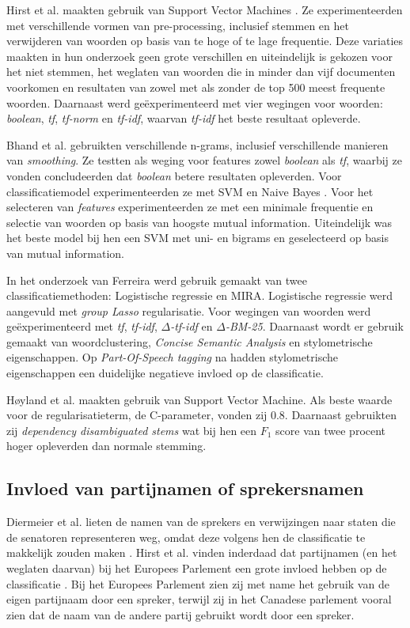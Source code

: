 Hirst et al. maakten  gebruik van Support Vector Machines \cite{Hirst_textto}. Ze experimenteerden met verschillende vormen van pre-processing, inclusief stemmen en het verwijderen van woorden op basis van te hoge of te lage frequentie. Deze variaties maakten in hun onderzoek geen grote verschillen en uiteindelijk is gekozen voor het niet stemmen, het weglaten van woorden die in minder dan vijf documenten voorkomen en resultaten van zowel met als zonder de top 500 meest frequente woorden. Daarnaast werd geëxperimenteerd met vier wegingen voor woorden: \textit{boolean}, \textit{tf}, \textit{tf-norm} en \textit{tf-idf}, waarvan \textit{tf-idf} het beste resultaat opleverde. \par
Bhand et al. gebruikten verschillende n-grams, inclusief verschillende manieren van \textit{smoothing}\cite{bhand}. Ze testten als weging voor features zowel \textit{boolean} als \textit{tf}, waarbij ze vonden concludeerden dat \textit{boolean} betere resultaten opleverden. Voor classificatiemodel experimenteerden ze met SVM en Naive Bayes . Voor het selecteren van \textit{features} experimenteerden ze met een minimale frequentie en selectie van woorden op basis van hoogste mutual information. Uiteindelijk was het beste model bij hen een SVM met uni- en bigrams en geselecteerd op basis van mutual information.\par
In het onderzoek van Ferreira werd gebruik gemaakt van twee classificatiemethoden: Logistische regressie en MIRA\cite{Ferreira2016UsingTT}. Logistische regressie werd aangevuld met \textit{group Lasso} regularisatie. Voor wegingen van woorden werd geëxperimenteerd met \textit{tf}, \textit{tf-idf}, \textit{$\Delta$-tf-idf} en \textit{$\Delta$-BM-25}. Daarnaast wordt er gebruik gemaakt van woordclustering, \textit{Concise Semantic Analysis} en stylometrische eigenschappen. Op \textit{Part-Of-Speech tagging} na hadden stylometrische eigenschappen een duidelijke negatieve invloed op de classificatie.\par
Høyland et al. maakten gebruik van Support Vector Machine\cite{W14-2516}. Als beste waarde voor de regularisatieterm, de C-parameter, vonden zij 0.8. Daarnaast gebruikten zij \textit{dependency disambiguated
stems} wat bij hen een $F_1$ score van twee procent hoger opleverden dan normale stemming.\par

\subsection{Invloed van partijnamen of sprekersnamen}
Diermeier et al. lieten de namen van de sprekers en verwijzingen naar staten die de senatoren representeren weg, omdat deze volgens hen de classificatie te makkelijk zouden maken \cite{diermeier_godbout_yu_kaufmann_2012}. Hirst et al. vinden inderdaad dat partijnamen (en het weglaten daarvan) bij het Europees Parlement een grote invloed hebben op de classificatie \cite{Hirst_textto}. Bij het Europees Parlement zien zij met name het gebruik van de eigen partijnaam door een spreker, terwijl zij in het Canadese parlement vooral zien dat de naam van de andere partij gebruikt wordt door een spreker.

